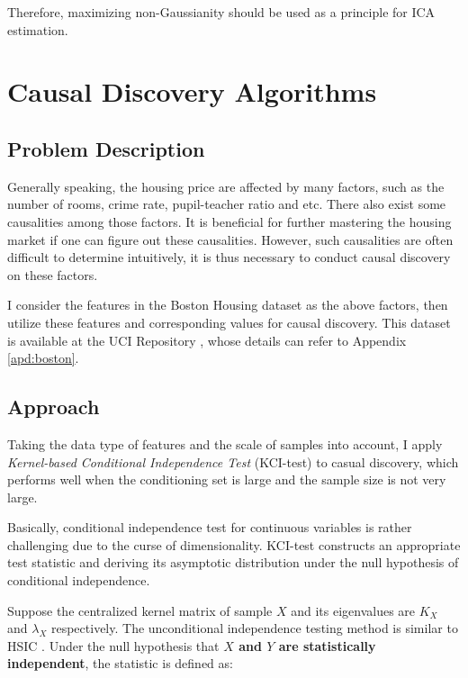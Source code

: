 \documentclass[12pt,a4paper]{article}
\theoremstyle{definition}
\begin{document}
\vspace{0.008\linewidth}
Therefore, maximizing non-Gaussianity should be used as a principle for ICA estimation.

\section{Causal Discovery Algorithms}

\subsection{Problem Description}

Generally speaking, the housing price are affected by many factors, such as the number of rooms, crime rate, pupil-teacher ratio and etc. There also exist some causalities among those factors. It is beneficial for further mastering the housing market if one can figure out these causalities. However, such causalities are often difficult to determine intuitively, it is thus necessary to conduct causal discovery on these factors.

\vspace{0.008\linewidth}
I consider the features in the Boston Housing dataset as the above factors, then utilize these features and corresponding values for causal discovery. This dataset is available at the UCI Repository \cite{boston}, whose details can refer to Appendix \ref{apd:boston}.

\subsection{Approach}
\label{sec:appro}

Taking the data type of features and the scale of samples into account, I apply \textit{Kernel-based Conditional Independence Test} (KCI-test) \cite{alg} to casual discovery, which performs well when the conditioning set is large and the sample size is not very large.

\vspace{0.008\linewidth}
Basically, conditional independence test for continuous variables is rather challenging due to the curse of dimensionality. KCI-test constructs an appropriate test statistic and deriving its asymptotic distribution under the null hypothesis of conditional independence.

\vspace{0.008\linewidth}
Suppose the centralized kernel matrix of sample $X$ and its eigenvalues are $K_X$ and $\lambda_X$ respectively. The unconditional independence testing method is similar to HSIC \cite{HSIC}. Under the null hypothesis that \textbf{$X$ and $Y$ are statistically independent}, the statistic is defined as:
\end{document}
